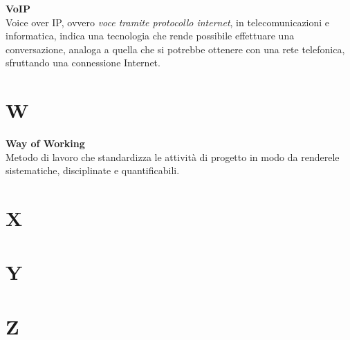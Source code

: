 \documentclass[a4paper, oneside, openany, dvipsnames, table, 12pt]{article}
\begin{document}
\textbf{VoIP} \\
Voice over IP, ovvero \textit{voce tramite protocollo internet}, in telecomunicazioni e informatica, indica una tecnologia che rende possibile effettuare una conversazione, analoga a quella che si potrebbe ottenere con una rete telefonica, sfruttando una connessione Internet.

\newpage
\section{W}
\textbf{Way of Working} \\
Metodo di lavoro che standardizza le attività di progetto in modo da renderele sistematiche, disciplinate e quantificabili.
\newpage
\section{X}

\newpage
\section{Y}

\newpage
\section{Z}
\end{document}
